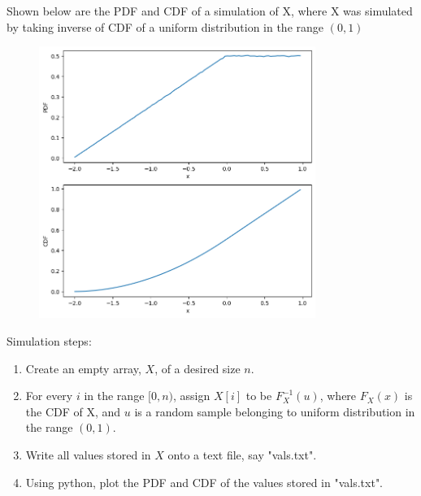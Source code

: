 \documentclass[]{article}
\begin{document}
Shown below are the PDF and CDF of a simulation of X, where X was simulated by taking inverse of CDF of a uniform distribution in the range $(0, 1)$
\begin{figure}[h]
    \centering
    \includegraphics[width=9cm]{./figs/z.png}
    \caption{}
    \label{fig:64ec/2022}
\end{figure}

Simulation steps:
\begin{enumerate}
    \item Create an empty array, $X$, of a desired size $n$.
    \item For every $i$ in the range $[0, n)$, assign $X[i]$ to be $F_X^{-1}(u)$, where $F_X(x)$ is the CDF of X, and $u$ is a random sample belonging to uniform distribution in the range $(0, 1)$.
    \item Write all values stored in $X$ onto a text file, say "vals.txt".
    \item Using python, plot the PDF and CDF of the values stored in "vals.txt".
\end{enumerate}
\end{document}
